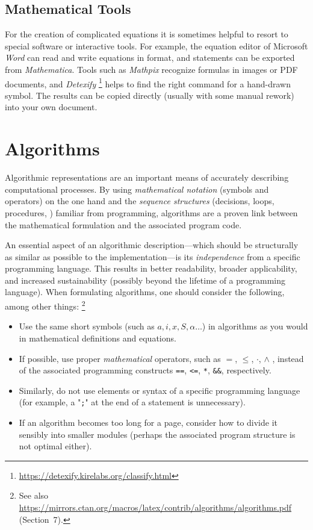 \subsection{Mathematical Tools}

For the creation of complicated equations it is sometimes helpful to resort
to special software or interactive tools. For example, the equation editor of
Microsoft \emph{Word} can read and write equations in \latex format, and
\latex statements can be exported from \emph{Mathematica}. Tools such as
\emph{Mathpix} recognize formulas in images or PDF documents, and
\emph{Detexify}%
\footnote{\url{https://detexify.kirelabs.org/classify.html}}
helps to find the right \latex command for a hand-drawn symbol. The results can
be copied directly (usually with some manual rework) into your own \latex
document.


\section{Algorithms}


Algorithmic representations are an important means of accurately describing
computational processes. By using \emph{mathematical notation} (symbols and 
operators) on the one hand and the \emph{sequence structures} (decisions, 
loops, procedures, \etc) familiar from programming, algorithms are a proven 
link between the mathematical formulation and the associated program code.

An essential aspect of an algorithmic description---which should be
structurally as similar as possible to the implementation---is its
\emph{independence} from a specific programming language.
This results in better readability, broader applicability, and increased
sustainability (possibly beyond the lifetime of a programming language).
When formulating algorithms, one should consider the following, among other
things:%
\footnote{See also
\url{https://mirrors.ctan.org/macros/latex/contrib/algorithms/algorithms.pdf}
(Section~7).}
%
\begin{itemize}
	\item
	Use the same short symbols (such as $a, i, x, S, \alpha \ldots$) in
	algorithms as you would in mathematical definitions and equations.
	\item
	If possible, use proper \emph{mathematical} operators, such as 
  $=$, $\leq$, $\cdot$, $\wedge$ \etc,
  instead of the associated programming constructs 
  \texttt{==}, \texttt{<=}, \texttt{*}, \texttt{\&\&}, respectively.
	\item
	Similarly, do not use elements or syntax of a specific programming language (for
	example, a "\texttt{;}" at the end of a statement is unnecessary).
	\item
	If an algorithm becomes too long for a page, consider how to divide it
	sensibly into smaller modules (perhaps the associated program structure
	is not optimal either).
\end{itemize}

